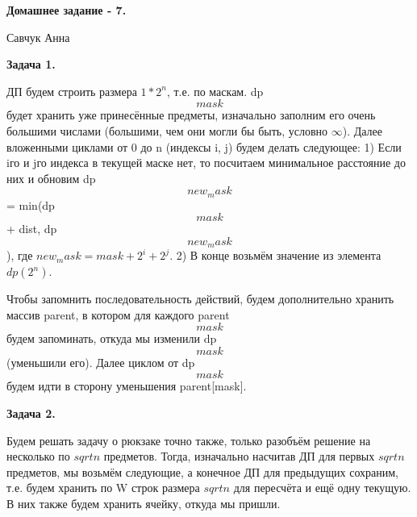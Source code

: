 \documentclass{article}
\begin{document}
{\bf
Домашнее задание  - 7.

Савчук Анна}

{\bf Задача 1.}

ДП будем строить размера $1 * 2^{n}$, т.е. по маскам. 
dp\[mask\] будет хранить уже принесённые предметы, изначально заполним его очень большими числами (большими, чем они могли бы быть, условно $\infty$).
Далее вложенными циклами от 0 до n (индексы i, j) будем делать следующее:
1) Если iго и jго индекса в текущей маске нет, то посчитаем минимальное расстояние до них и обновим dp\[new_mask\] = min(dp\[mask\] + dist, dp\[new_mask\]), где $new_mask = mask + 2^{i} + 2^{j}$. 
2) В конце возьмём значение из элемента $dp(2^{n})$.

Чтобы запомнить последовательность действий, будем дополнительно хранить массив parent, в котором для каждого parent\[mask\] будем запоминать, откуда мы изменили dp\[mask\] (уменьшили его). Далее циклом от dp\[mask\] будем идти в сторону уменьшения parent[mask].

{\bf Задача 2.}

Будем  решать задачу о рюкзаке точно также, только разобъём решение на несколько по $sqrt{n}$ предметов. Тогда, изначально насчитав ДП для первых $sqrt{n}$ предметов, мы возьмём следующие, а конечное ДП для предыдущих сохраним, т.е. будем хранить по W строк размера  $sqrt{n}$ для пересчёта и ещё одну текущую. В них также будем хранить ячейку, откуда мы пришли.
\end{document}
